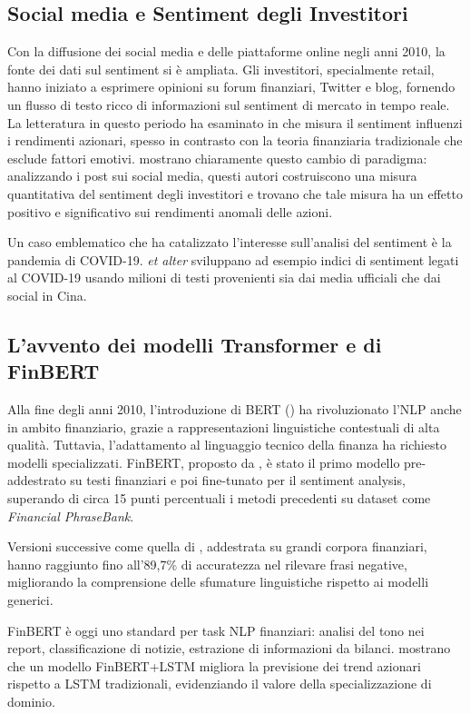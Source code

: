 \documentclass[a4paper,12pt]{article}
\begin{document}
\subsection{Social media e Sentiment degli Investitori}
Con la diffusione dei social media e delle piattaforme online negli anni 2010, la fonte dei dati sul sentiment si è ampliata. Gli investitori, specialmente retail, hanno iniziato a esprimere opinioni su forum finanziari, Twitter e blog, fornendo un flusso di testo ricco di informazioni sul sentiment di mercato in tempo reale. \\ 
La letteratura in questo periodo ha esaminato in che misura il sentiment influenzi i rendimenti azionari, spesso in contrasto con la teoria finanziaria tradizionale che esclude fattori emotivi. \textcite{mcgurk2020stock} mostrano chiaramente questo cambio di paradigma: analizzando i post sui social media, questi autori costruiscono una misura quantitativa del sentiment degli investitori e trovano che tale misura ha un effetto positivo e significativo sui rendimenti anomali delle azioni.

Un caso emblematico che ha catalizzato l’interesse sull’analisi del sentiment è la pandemia di COVID-19. \textcite{duan2021covid} \textit{et alter} sviluppano ad esempio indici di sentiment legati al COVID-19 usando milioni di testi provenienti sia dai media ufficiali che dai social in Cina.
\subsection{L'avvento dei modelli Transformer e di FinBERT}

Alla fine degli anni 2010, l’introduzione di BERT (\textcite{devlin2018bert}) ha rivoluzionato l’NLP anche in ambito finanziario, grazie a rappresentazioni linguistiche contestuali di alta qualità. Tuttavia, l’adattamento al linguaggio tecnico della finanza ha richiesto modelli specializzati. FinBERT, proposto da \textcite{araci2019finbert}, è stato il primo modello pre-addestrato su testi finanziari e poi fine-tunato per il sentiment analysis, superando di circa 15 punti percentuali i metodi precedenti su dataset come \textit{Financial PhraseBank}.

Versioni successive come quella di \textcite{huang2022finbert}, addestrata su grandi corpora finanziari, hanno raggiunto fino all’89,7\% di accuratezza nel rilevare frasi negative, migliorando la comprensione delle sfumature linguistiche rispetto ai modelli generici.

FinBERT è oggi uno standard per task NLP finanziari: analisi del tono nei report, classificazione di notizie, estrazione di informazioni da bilanci. \textcite{gu2024finbert} mostrano che un modello FinBERT+LSTM migliora la previsione dei trend azionari rispetto a LSTM tradizionali, evidenziando il valore della specializzazione di dominio.
\end{document}
